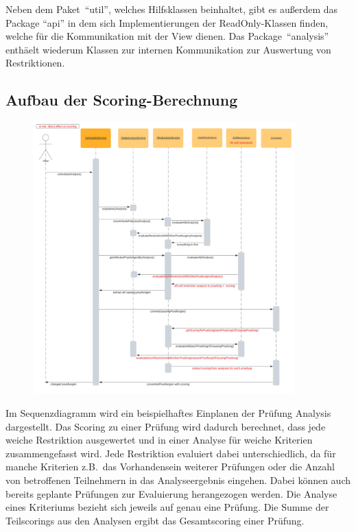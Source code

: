 Neben dem Paket~\enquote{util}, welches Hilfsklassen beinhaltet, gibt es außerdem das Package \enquote{api}
in dem sich Implementierungen der ReadOnly-Klassen finden, welche für die Kommunikation mit der View dienen.
Das Package~\enquote{analysis} enthäelt wiederum Klassen zur internen Kommunikation zur Auswertung von Restriktionen.
\pagebreak

\subsection{Aufbau der Scoring-Berechnung}\label{subsec:aufbau-der-scoring-berechnung}
\begin{figure}[!h]
    \includegraphics[width=0.9\textwidth]{extra/sequence_diagram_high_res}\label{fig:figure}
\end{figure}

Im Sequenzdiagramm wird ein beispielhaftes Einplanen der Prüfung Analysis dargestellt.
Das Scoring zu einer Prüfung wird dadurch berechnet, dass jede weiche Restriktion ausgewertet und in
einer Analyse für weiche Kriterien zusammengefasst wird.
Jede Restriktion evaluiert dabei unterschiedlich, da für manche Kriterien z.B.\ das Vorhandensein weiterer
Prüfungen oder die Anzahl von betroffenen Teilnehmern in das Analyseergebnis eingehen.
Dabei können auch bereits geplante Prüfungen zur Evaluierung herangezogen werden.
Die Analyse eines Kriteriums bezieht sich jeweils auf genau eine Prüfung.
Die Summe der Teilscorings aus den Analysen ergibt das Gesamtscoring einer Prüfung.
